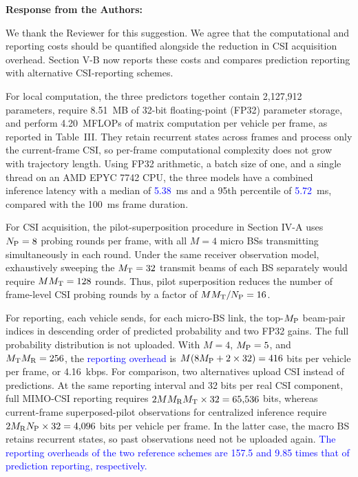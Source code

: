\documentclass[11pt]{article}
\newenvironment{reviewedit}[1]
{\colorlet{responseblue}{#1}\colorlet{changeblue}{#1}\color{#1}}
{}
\newenvironment{authorresponse}
{\par\Needspace{3\baselineskip}\noindent\textcolor{responseblue}{\textbf{Response from the Authors:}}\par\nobreak\color{responseblue}}
{\par}
\begin{document}
\begin{reviewedit}{blue}
\begin{authorresponse}
We thank the Reviewer for this suggestion. We agree that the computational
and reporting costs should be quantified alongside the reduction in CSI
acquisition overhead. Section V-B now reports these costs and compares prediction
reporting with alternative CSI-reporting schemes.

For local computation, the three predictors together contain 2,127,912
parameters, require 8.51~MB of 32-bit floating-point (FP32) parameter storage,
and perform 4.20~MFLOPs of matrix computation per vehicle per frame, as
reported in Table~III. They retain recurrent states across frames and process
only the current-frame CSI, so per-frame computational complexity does not grow with
trajectory length. Using FP32 arithmetic, a batch size of one, and a single
thread on an AMD EPYC 7742 CPU, the three models have a combined inference
latency with a median of \textcolor{blue}{5.38}~ms and a 95th percentile of \textcolor{blue}{5.72}~ms, compared
with the 100~ms frame duration.

For CSI acquisition, the pilot-superposition procedure in Section IV-A
uses $N_{\rm P}=8$ probing rounds per frame, with all $M=4$ micro BSs
transmitting simultaneously in each round. Under the same receiver
observation model, exhaustively sweeping the $M_{\rm T}=32$ transmit beams
of each BS separately would require $MM_{\rm T}=128$ rounds.
Thus, pilot superposition reduces the number of frame-level CSI probing
rounds by a factor of $MM_{\rm T}/N_{\rm P}=16$.

For reporting, each vehicle sends, for each micro-BS link, the top-$M_{\rm P}$ beam-pair
indices in descending order of predicted probability and two FP32 gains. 
The full probability distribution is not uploaded. With $M=4$, $M_{\rm P}=5$, and
$M_{\rm T}M_{\rm R}=256$, the \textcolor{blue}{reporting overhead} is
$M(8M_{\rm P}+2\times32)=416$ bits per vehicle per frame, or 4.16~kbps.
For comparison, two alternatives upload CSI instead of predictions.
At the same reporting interval and 32 bits per real CSI component,
full MIMO-CSI reporting requires $2MM_{\rm R}M_{\rm T}\times32=65{,}536$
bits, whereas current-frame superposed-pilot observations for centralized
inference require $2M_{\rm R}N_{\rm P}\times32=4{,}096$ bits per vehicle
per frame. In the latter case, the macro BS retains recurrent states, so
past observations need not be uploaded again. \textcolor{blue}{The reporting
overheads of the two reference schemes are 157.5 and 9.85 times that of
prediction reporting, respectively.}


\end{authorresponse}
\end{reviewedit}
\end{document}
